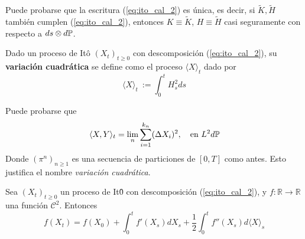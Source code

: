 \begin{remark}
        Puede probarse que la escritura (\ref{eq:ito_cal_2}) es única, es decir, si $\tilde{K}, \tilde{H}$ 
        también cumplen (\ref{eq:ito_cal_2}), entonces $K \equiv \tilde{K}$, $H \equiv \tilde{H}$ casi 
        seguramente con respecto a $ds \otimes d\P$. 
\end{remark}

\begin{definition}
        Dado un proceso de It\^{o} $(X_t)_{t \ge 0}$ con descomposición (\ref{eq:ito_cal_2}), su 
        \textbf{variación cuadrática} se define como el proceso $\langle X \rangle_t$ dado por
        \begin{equation*}
                \langle X \rangle_t ~ := \int_{0}^{t} H^2_s ds
        \end{equation*}
\end{definition}
\begin{remark}
        Puede probarse que 
        \begin{equation*}
                \langle X,Y \rangle_t = \lim_{n} \sum_{i=1}^{k_n} (\Delta X_i)^2, ~ ~ \text{ en } L^2{d\P}
        \end{equation*}
        Donde $(\pi^{n})_{n \ge 1}$ es una secuencia de particiones de $[0,T]$ como antes. Esto 
        justifica el nombre \textit{variación cuadrática}.
\end{remark}

\begin{theorem}
        Sea $(X_t)_{t \ge 0}$ un proceso de It\^{0} con descomposición (\ref{eq:ito_cal_2}), 
        y $f: \mathbb{R} \to  \mathbb{R}$ una función $\mathcal{C}^2$. Entonces 
        \begin{equation*}
                \label{eq:ito_cal_3}
                \tag{$\star$}
                f(X_t)  = f(X_0) + \int_{0}^{t} f'(X_s) dX_s +  \frac{1}{2}
                \int_{0}^{t} f''(X_s) d \langle X \rangle_s
        \end{equation*}
\end{theorem}

